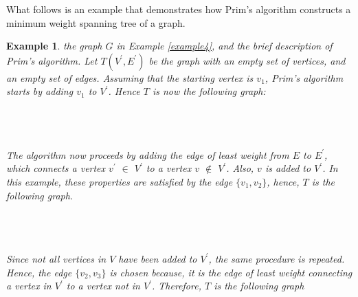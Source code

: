 \documentclass[12pt]{article}
\newtheorem{example}[definition]{Example}
\numberwithin{equation}{subsection}
\numberwithin{table}{subsection}
\numberwithin{algorithm}{subsection}
\begin{document}
What follows is an example that demonstrates how Prim's algorithm constructs a minimum weight spanning tree of a graph.
\begin{example}
\label{example_prim}
 the graph $G$ in Example \ref{example4}, and the brief description of Prim's algorithm. Let $T(V^\prime,E^\prime)$ be the graph with an empty set of vertices, and an empty set of edges. Assuming that the starting vertex is $v_1$, Prim's algorithm starts by adding $v_1$ to $V^\prime$. Hence $T$ is now the following graph:\\\\
\\\\
The algorithm now proceeds by adding the edge of least weight from $E$ to $E^\prime$, which connects a vertex $v^\prime$ $\in$ $V^\prime$ to a vertex $v$ $\notin$ $V^\prime$. Also, $v$ is added to $V^\prime$. In this example, these properties are satisfied by the edge $\{v_1, v_2\}$, hence, $T$ is the following graph.\\\\
\\\\
Since not all vertices in $V$ have been added to $V^\prime$, the same procedure is repeated. Hence, the edge $\{v_2, v_3\}$ is chosen because, it is the edge of least weight connecting a vertex in $V^\prime$ to a vertex not in $V^\prime$. Therefore, $T$ is the following graph\\\\
\begin{tikzpicture}[
    > = , %
    shorten > = 1pt, %
    auto,
    node distance = 3cm, %
    semithick %
    ]


\end{tikzpicture}
\end{example}
\end{document}
